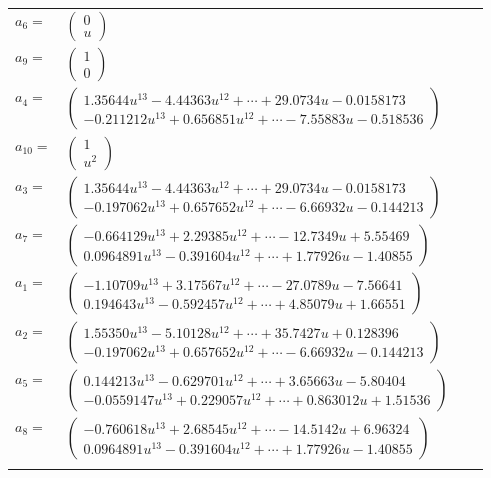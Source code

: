 \documentclass[1p]{elsarticle_modified}
\theoremstyle{definition}
\begin{document}
\begin{tabular}{m{7pt} m{180pt} m{7pt} m{180pt} }
\flushright $a_{6}=$&$\begin{pmatrix}0\\u\end{pmatrix}$ \\
\flushright $a_{9}=$&$\begin{pmatrix}1\\0\end{pmatrix}$ \\
\flushright $a_{4}=$&$\begin{pmatrix}1.35644 u^{13}-4.44363 u^{12}+\cdots+29.0734 u-0.0158173\\-0.211212 u^{13}+0.656851 u^{12}+\cdots-7.55883 u-0.518536\end{pmatrix}$ \\
\flushright $a_{10}=$&$\begin{pmatrix}1\\u^2\end{pmatrix}$ \\
\flushright $a_{3}=$&$\begin{pmatrix}1.35644 u^{13}-4.44363 u^{12}+\cdots+29.0734 u-0.0158173\\-0.197062 u^{13}+0.657652 u^{12}+\cdots-6.66932 u-0.144213\end{pmatrix}$ \\
\flushright $a_{7}=$&$\begin{pmatrix}-0.664129 u^{13}+2.29385 u^{12}+\cdots-12.7349 u+5.55469\\0.0964891 u^{13}-0.391604 u^{12}+\cdots+1.77926 u-1.40855\end{pmatrix}$ \\
\flushright $a_{1}=$&$\begin{pmatrix}-1.10709 u^{13}+3.17567 u^{12}+\cdots-27.0789 u-7.56641\\0.194643 u^{13}-0.592457 u^{12}+\cdots+4.85079 u+1.66551\end{pmatrix}$ \\
\flushright $a_{2}=$&$\begin{pmatrix}1.55350 u^{13}-5.10128 u^{12}+\cdots+35.7427 u+0.128396\\-0.197062 u^{13}+0.657652 u^{12}+\cdots-6.66932 u-0.144213\end{pmatrix}$ \\
\flushright $a_{5}=$&$\begin{pmatrix}0.144213 u^{13}-0.629701 u^{12}+\cdots+3.65663 u-5.80404\\-0.0559147 u^{13}+0.229057 u^{12}+\cdots+0.863012 u+1.51536\end{pmatrix}$ \\
\flushright $a_{8}=$&$\begin{pmatrix}-0.760618 u^{13}+2.68545 u^{12}+\cdots-14.5142 u+6.96324\\0.0964891 u^{13}-0.391604 u^{12}+\cdots+1.77926 u-1.40855\end{pmatrix}$\\&\end{tabular}
\end{document}
